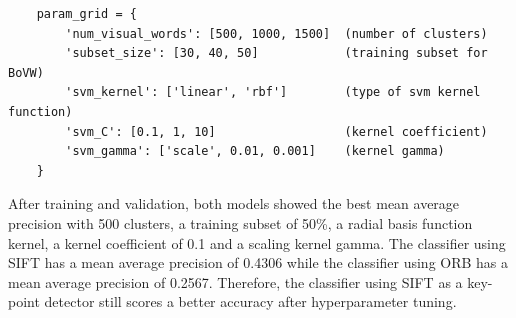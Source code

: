 \documentclass[12pt,a4paper,oneside]{paper}
\begin{document}
\begin{verbatim}
    param_grid = {
        'num_visual_words': [500, 1000, 1500]  (number of clusters)
        'subset_size': [30, 40, 50]            (training subset for BoVW)
        'svm_kernel': ['linear', 'rbf']        (type of svm kernel function)
        'svm_C': [0.1, 1, 10]                  (kernel coefficient)
        'svm_gamma': ['scale', 0.01, 0.001]    (kernel gamma)
    }
\end{verbatim}

After training and validation, both models showed the best mean average precision with 500 clusters, a training subset of 50\%, a radial basis function kernel, a kernel coefficient of 0.1 and a scaling kernel gamma.
The classifier using SIFT has a mean average precision of 0.4306 while the classifier using ORB has a mean average precision of 0.2567.
Therefore, the classifier using SIFT as a key-point detector still scores a better accuracy after hyperparameter tuning.






\clearpage

\appendix


\newpage
\printbibliography
\end{document}
